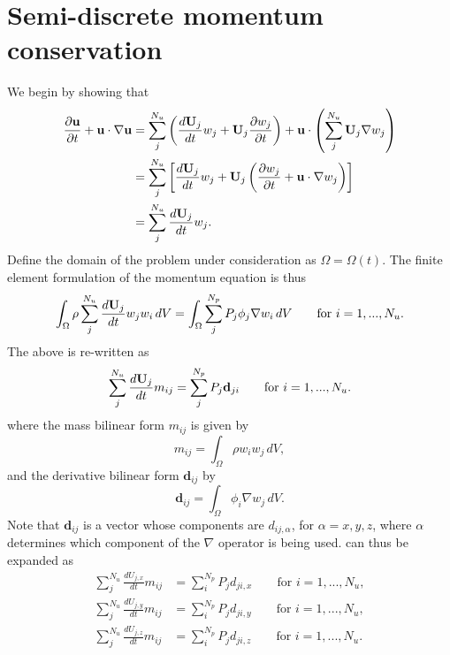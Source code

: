 \documentclass[11pt]{article}
\begin{document}
\section{Semi-discrete momentum conservation}
We begin by showing that
\begin{align}
    \frac{\partial \mathbf{u}}{\partial t} + \mathbf{u} \cdot \nabla \mathbf{u} &= \sum_j^{N_u} \left ( \frac{d \mathbf{U}_j}{d t} w_j + \mathbf{U}_j \frac{\partial w_j}{\partial t} \right ) + \mathbf{u} \cdot \left ( \sum_j^{N_u} \mathbf{U}_j \nabla w_j \right ) \nonumber \\
    &= \sum_j^{N_u} \left [ \frac{d \mathbf{U}_j}{d t} w_j + \mathbf{U}_j \left ( \frac{\partial w_j}{\partial t} + \mathbf{u} \cdot \nabla w_j \right ) \right ] \nonumber \\
    &= \sum_j^{N_u} \frac{d \mathbf{U}_j}{d t} w_j.
\end{align}
Define the domain of the problem under consideration as $\Omega = \Omega(t)$. The finite element formulation of the momentum equation is thus 
\begin{equation}
    \int_\Omega \rho \sum_j^{N_u} \frac{d \mathbf{U}_j}{d t} w_j w_i \, dV = \int_\Omega \sum_j^{N_p} P_j \phi_j \nabla w_i \, dV \qquad \text{for } i = 1,...,N_u.
\end{equation}
The above is re-written as
\begin{equation}
    \label{eq:semi_discrete_momentum_bilinear}
    \sum_j^{N_u} \frac{d \mathbf{U}_j}{d t} m_{ij} = \sum_j^{N_p} P_j \mathbf{d}_{ji} \qquad \text{for } i = 1,...,N_u.
\end{equation}
where the mass bilinear form $m_{ij}$ is given by 
\begin{equation}
    m_{ij} = \int_\Omega \rho w_i w_j \, dV,
\end{equation}
and the derivative bilinear form $\mathbf{d}_{ij}$ by 
\begin{equation}
    \mathbf{d}_{ij} = \int_\Omega \phi_i \nabla w_j \, dV.
\end{equation}
Note that $\mathbf{d}_{ij}$ is a vector whose components are $d_{ij,\alpha}$, for $\alpha = x,y,z$, where $\alpha$ determines which component of the $\nabla$ operator is being used.  can thus be expanded as
\begin{align}
    \label{eq:semi_discrete_momentum_bilinear_expanded}
    \sum_j^{N_u} \frac{d U_{j,x}}{d t} m_{ij} &= \sum_i^{N_p} P_j d_{ji,x} \qquad \text{for } i = 1,...,N_u, \nonumber \\
    \sum_j^{N_u} \frac{d U_{j,y}}{d t} m_{ij} &= \sum_i^{N_p} P_j d_{ji,y} \qquad \text{for } i = 1,...,N_u, \nonumber \\
    \sum_j^{N_u} \frac{d U_{j,z}}{d t} m_{ij} &= \sum_i^{N_p} P_j d_{ji,z} \qquad \text{for } i = 1,...,N_u.
\end{align}
\end{document}
